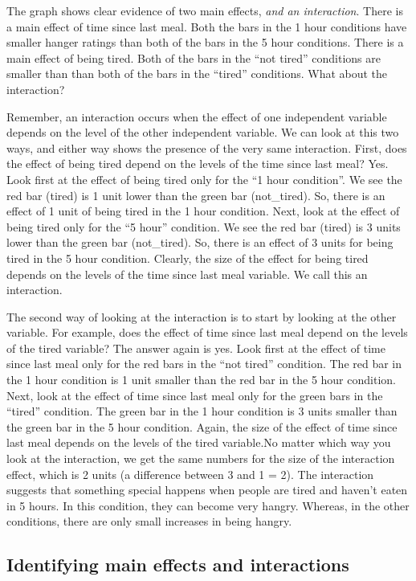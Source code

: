 The graph shows clear evidence of two main effects,
\emph{and an interaction}. There is a main effect of time since last
meal. Both the bars in the 1 hour conditions have smaller hanger ratings
than both of the bars in the 5 hour conditions. There is a main effect
of being tired. Both of the bars in the ``not tired'' conditions are
smaller than than both of the bars in the ``tired'' conditions. What
about the interaction?

Remember, an interaction occurs when the effect of one independent
variable depends on the level of the other independent variable. We can
look at this two ways, and either way shows the presence of the very
same interaction. First, does the effect of being tired depend on the
levels of the time since last meal? Yes. Look first at the effect of
being tired only for the ``1 hour condition''. We see the red bar
(tired) is 1 unit lower than the green bar (not\_tired). So, there is an
effect of 1 unit of being tired in the 1 hour condition. Next, look at
the effect of being tired only for the ``5 hour'' condition. We see the
red bar (tired) is 3 units lower than the green bar (not\_tired). So,
there is an effect of 3 units for being tired in the 5 hour condition.
Clearly, the size of the effect for being tired depends on the levels of
the time since last meal variable. We call this an interaction.

The second way of looking at the interaction is to start by looking at
the other variable. For example, does the effect of time since last meal
depend on the levels of the tired variable? The answer again is yes.
Look first at the effect of time since last meal only for the red bars
in the ``not tired'' condition. The red bar in the 1 hour condition is 1
unit smaller than the red bar in the 5 hour condition. Next, look at the
effect of time since last meal only for the green bars in the ``tired''
condition. The green bar in the 1 hour condition is 3 units smaller than
the green bar in the 5 hour condition. Again, the size of the effect of
time since last meal depends on the levels of the tired variable.No
matter which way you look at the interaction, we get the same numbers
for the size of the interaction effect, which is 2 units (a difference
between 3 and 1 = 2). The interaction suggests that something special
happens when people are tired and haven't eaten in 5 hours. In this
condition, they can become very hangry. Whereas, in the other
conditions, there are only small increases in being hangry.

\subsection{Identifying main effects and
interactions}\label{identifying-main-effects-and-interactions}

